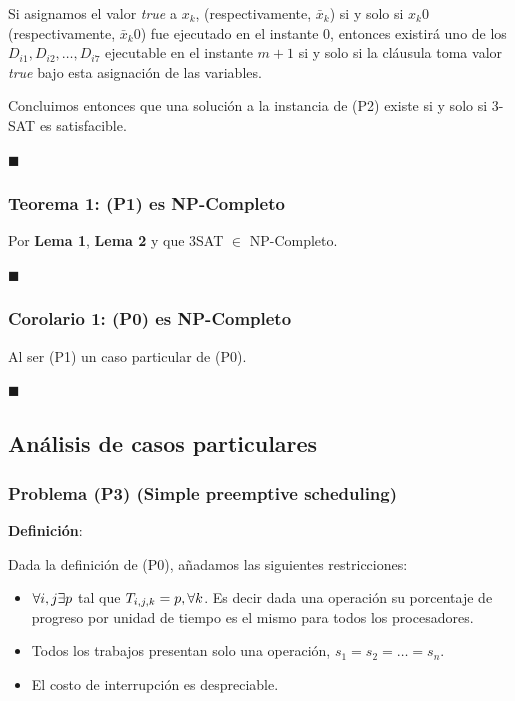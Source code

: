 \documentclass[14pt]{extarticle}
\begin{document}
Si asignamos el valor \textit{true} a $x_k$, (respectivamente, $\bar x_k$) si y solo si $x_k0$ (respectivamente, $\bar x_k0$) fue ejecutado en el instante 0, entonces existirá uno de los $D_{i1}, D_{i2}, \ldots, D_{i7}$ ejecutable en el instante $m + 1$ si y solo si la cláusula toma valor \textit{true} bajo esta asignación de las variables.

Concluimos entonces que una solución a la instancia de (P2) existe si y solo si 3-SAT es satisfacible.

$\blacksquare$

\subsubsection*{Teorema 1: (P1) es NP-Completo}

Por \textbf{Lema 1}, \textbf{Lema 2} y que 3SAT $\in$ NP-Completo.

$\blacksquare$

\subsubsection*{Corolario 1: (P0) es NP-Completo}

Al ser (P1) un caso particular de (P0).

$\blacksquare$

\subsection*{Análisis de casos particulares}

\subsubsection*{Problema (P3) (Simple preemptive scheduling)}

\textbf{Definición}:

Dada la definición de (P0), añadamos las siguientes restricciones:

\begin{itemize}
    \item $\forall i, j \space \exists p$ tal que $T_{i, j, k} = p, \space \forall k$. Es decir dada una operación su porcentaje de progreso por unidad de tiempo es el mismo para todos los procesadores.
    \item Todos los trabajos presentan solo una operación, $s_1 = s_2 = \ldots = s_n$.
    \item El costo de interrupción es despreciable.
\end{itemize}
\end{document}
